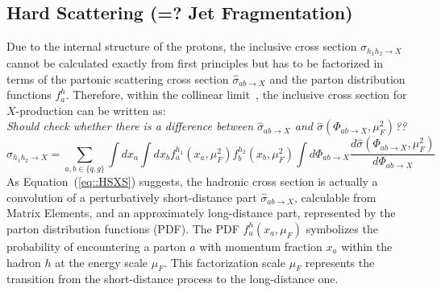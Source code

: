 \subsection{Hard Scattering (=? Jet Fragmentation)} \label{sec::HardScattering}
Due to the internal structure of the protons, the inclusive cross section $\sigma_{h_{1}h_{2} \rightarrow X}$ cannot be calculated exactly from first principles but has to be factorized in terms of the partonic scattering cross section $\hat{\sigma}_{ab \rightarrow X}$ and the parton distribution functions $f_{a}^{h}$. Therefore, within the collinear limit~\cite{ColLimit}, the inclusive cross section for $X$-production can be written as:
\\ \textit{Should check whether there is a difference between $\hat{\sigma}_{ab \rightarrow X}$ and $\hat{\sigma}(\Phi_{ab \rightarrow X},\mu^{2}_{F})$??}
\begin{equation} \label{eq::HSXS}
 \sigma_{h_{1}h_{2} \rightarrow X} =\sum_{a,b \in \{q,g\} } \int dx_{a} \int dx_{b} f_{a}^{h_{1}}(x_{a},\mu^{2}_{F}) f_{b}^{h_{2}}(x_{b},\mu^{2}_{F}) \int d\Phi_{ab \rightarrow X} \dfrac{d\hat{\sigma}(\Phi_{ab \rightarrow X},\mu^{2}_{F})}{d\Phi_{ab \rightarrow X}}
\end{equation}
As Equation~(\ref{eq::HSXS}) suggests, the hadronic cross section is actually a convolution of a perturbatively short-distance part $\hat{\sigma}_{ab \rightarrow X}$, calculable from Matrix Elements, and an approximately long-distance part, represented by the parton distribution functions (PDF). The PDF $f_{a}^{h}(x_{a},\mu_{F})$ symbolizes the probability of encountering a parton $a$ with momentum fraction $x_a$ within the hadron $h$ at the energy scale $\mu_{F}$. This factorization scale $\mu_{F}$ represents the transition from the short-distance process to the long-distance one.\\
